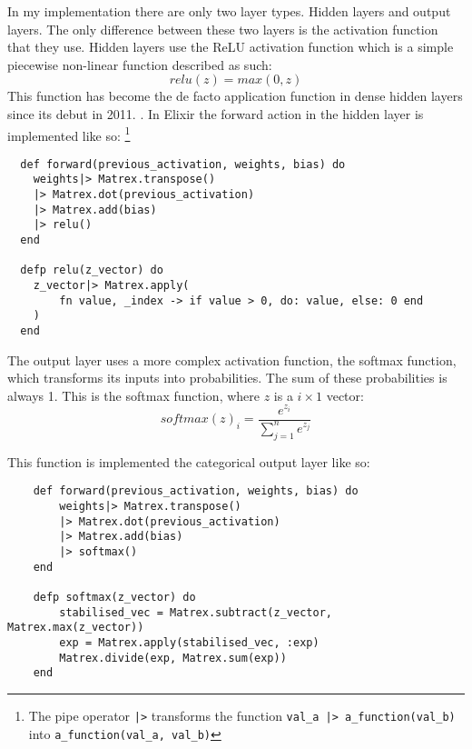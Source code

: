 In my implementation there are only two layer types. Hidden layers and output
layers. The only difference between these two layers is the activation function
that they use. Hidden layers use the ReLU activation function which is a simple
piecewise non-linear function described as such:
\begin{equation}
    relu(z) = max(0,z)
\end{equation}
This function has become the de facto application function in dense hidden
layers since its debut in 2011. \cite{glorot2011deep}. In Elixir the forward
action in the hidden layer is implemented like so: \footnote{The pipe operator
\lstinline{|>} transforms the function \lstinline{val_a |> a_function(val_b)}
into \lstinline{a_function(val_a, val_b)}}
\begin{lstlisting}
  def forward(previous_activation, weights, bias) do
    weights|> Matrex.transpose()
    |> Matrex.dot(previous_activation)
    |> Matrex.add(bias)
    |> relu()
  end

  defp relu(z_vector) do
    z_vector|> Matrex.apply(
        fn value, _index -> if value > 0, do: value, else: 0 end
    )
  end
\end{lstlisting}

The output layer uses a more complex activation function, the softmax function,
which transforms its inputs into probabilities. The sum of these probabilities
is always 1. This is the softmax function, where \(z\) is a \(i \times 1\)
vector:
\begin{equation}
    softmax(z)_{i} = \frac{e^{z_{i}}}{\sum_{j=1}^{n} e^{z_{j}}}
\end{equation}

This function is implemented the categorical output layer like so:
\begin{lstlisting}
    def forward(previous_activation, weights, bias) do
        weights|> Matrex.transpose()
        |> Matrex.dot(previous_activation)
        |> Matrex.add(bias)
        |> softmax()
    end

    defp softmax(z_vector) do
        stabilised_vec = Matrex.subtract(z_vector, Matrex.max(z_vector))
        exp = Matrex.apply(stabilised_vec, :exp)
        Matrex.divide(exp, Matrex.sum(exp))
    end
\end{lstlisting}







